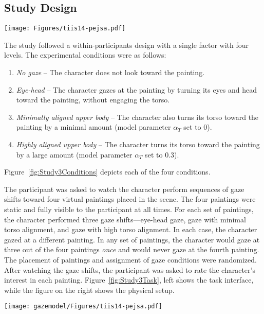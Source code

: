 \subsection{Study Design}

\begin{figure*}[t]
\centering
\texttt{[image: Figures/tiis14-pejsa.pdf]}
\caption{Experimental conditions in Study 3.}
\label{fig:Study3Conditions}
\end{figure*}

The study followed a within-participants design with a single factor with four levels. The experimental conditions were as follows:

\begin{enumerate}
\item \emph{No gaze} -- The character does not look toward the painting.
\item \emph{Eye-head} -- The character gazes at the painting by turning its eyes and head toward the painting, without engaging the torso.
\item \emph{Minimally aligned upper body} -- The character also turns its torso toward the painting by a minimal amount (model parameter $\alpha_T$ set to 0).
\item \emph{Highly aligned upper body} -- The character turns its torso toward the painting by a large amount (model parameter $\alpha_T$ set to 0.3).
\end{enumerate}

Figure~\ref{fig:Study3Conditions} depicts each of the four conditions.

The participant was asked to watch the character perform sequences of gaze shifts toward four virtual paintings placed in the scene. The four paintings were static and fully visible to the participant at all times. For each set of paintings, the character performed three gaze shifts---eye-head gaze, gaze with minimal torso alignment, and gaze with high torso alignment. In each case, the character gazed at a different painting. In any set of paintings, the character would gaze at three out of the four paintings \emph{once} and would never gaze at the fourth painting. The placement of paintings and assignment of gaze conditions were randomized. After watching the gaze shifts, the participant was asked to rate the character's interest in each painting. Figure~\ref{fig:Study3Task}, left shows the task interface, while the figure on the right shows the physical setup.

\begin{figure*}
\centering
\texttt{[image: gazemodel/Figures/tiis14-pejsa.pdf]}
\caption{Experimental task in Study 3. Left: Task interface. Right: An experimenter demonstrating the task.}
\label{fig:Study3Task}
\end{figure*}


